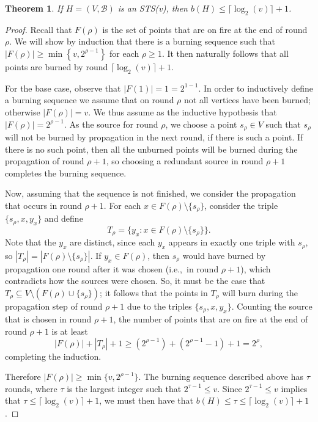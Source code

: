 \documentclass[12pt]{article}
\newtheorem{theorem}{Theorem}[section]
\theoremstyle{definition}
\numberwithin{table}{section}
\newcommand{\round}{{\rho}}
\begin{document}
\begin{theorem}
\label{upper_bound_sts}
If $H=(V,\mathcal{B})$ is an STS(v), then $b(H)\leq \lceil \log_2(v)\rceil+1$.
\end{theorem}
\begin{proof}
Recall that $F(\round)$ is the set of points that are on fire at the end of round $\round$.  We will show by induction that there is a burning sequence such that $|F(\round)|\geq\min\left\{v,2^{\round-1}\right\}$ for each $\round\geq 1$.
    It then naturally follows that all points are burned by round $\lceil \log_2(v)\rceil+1$. 
    
    For the base case, observe that $|F(1)|=1=2^{1-1}$. 
    In order to inductively define a burning sequence we assume that on round $\round$ not all vertices have been burned; otherwise $|F(\round)|=v$. We thus assume as the inductive hypothesis that 
    $|F(\round)| = 2^{\round-1}$. 
    As the source for round $\round$, 
    we choose a point $s_\round \in V$ such that $s_\round$ will not be burned by propagation in the next round, if there is such a point. 
    If there is no such point, then all the unburned points will be burned during the propagation of round $\round+1$, so choosing a redundant source in round $\round+1$ completes the burning sequence. 
    
    Now, assuming that the sequence is not finished, we consider the propagation that occurs in round $\round+1$. 
    For each $x\in F(\round)\setminus\{s_\round\}$, consider the triple $\{s_\round ,x,y_x\}$ and define
    \[
    T_\round = \{y_x : x\in F(\round)\setminus\{s_\round\}\}.
    \]
    Note that the $y_x$ are distinct, since each $y_x$ appears in exactly one triple with $s_\round$, 
    so $|T_\round|=|F(\round)\setminus\{s_\round\}|$.
    If $y_x\in F(\round)$, then $s_\round$ would have burned by propagation one round after it was chosen (i.e.,~in round $\round+1$), which contradicts how the sources were chosen. So, it must be the case that $T_\round \subseteq V \setminus (F(\round) \cup \{s_\round\})$; it follows that 
    the points in $T_\round$  will burn during the propagation step of round $\round+1$ due to the triples $\{s_\round,x,y_x\}$. 
    Counting the source that is chosen in round $\round+1$, the number of points that are on fire at the end of round $\round+1$ is at least 
    \[
    |F(\round)|+|T_\round|+1 \geq (2^{\round-1})+(2^{\round-1}-1)+1=2^{\round},
    \]
     completing the induction. 

    Therefore $|F(\round)| \geq \min\{v,2^{\round-1}\}$.
    The burning sequence described above has $\tau$ rounds, where $\tau$ is the largest integer such that $2^{\tau-1}\leq v$.
    Since $2^{\tau-1}\leq v$ implies that $\tau\leq\lceil \log_2(v)\rceil+1$, we must then have that 
    $b(H)\leq \tau\leq\lceil \log_2(v)\rceil+1$.  \end{proof}
\end{document}
